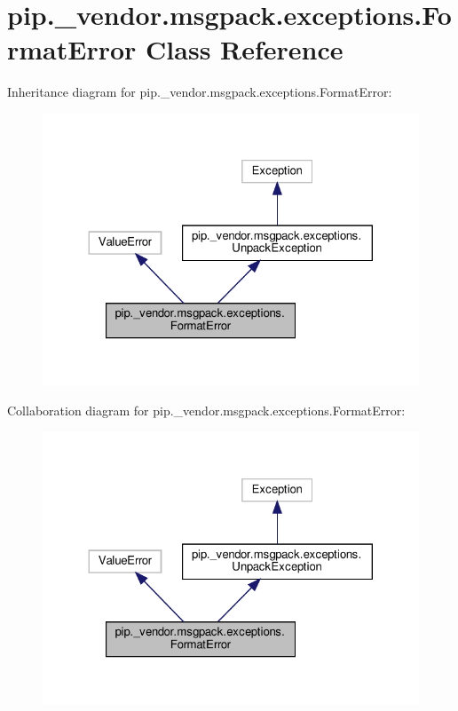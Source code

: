 \hypertarget{classpip_1_1__vendor_1_1msgpack_1_1exceptions_1_1FormatError}{}\section{pip.\+\_\+vendor.\+msgpack.\+exceptions.\+Format\+Error Class Reference}
\label{classpip_1_1__vendor_1_1msgpack_1_1exceptions_1_1FormatError}


Inheritance diagram for pip.\+\_\+vendor.\+msgpack.\+exceptions.\+Format\+Error\+:
\nopagebreak
\begin{figure}[H]
\begin{center}
\leavevmode
\includegraphics[width=324pt]{classpip_1_1__vendor_1_1msgpack_1_1exceptions_1_1FormatError__inherit__graph}
\end{center}
\end{figure}


Collaboration diagram for pip.\+\_\+vendor.\+msgpack.\+exceptions.\+Format\+Error\+:
\nopagebreak
\begin{figure}[H]
\begin{center}
\leavevmode
\includegraphics[width=324pt]{classpip_1_1__vendor_1_1msgpack_1_1exceptions_1_1FormatError__coll__graph}
\end{center}
\end{figure}


